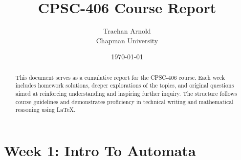 \documentclass[11pt]{article}
\title{CPSC-406 Course Report}
\author{Traehan Arnold \\ Chapman University}
\date{\today}
\begin{document}
\maketitle

\begin{abstract}
This document serves as a cumulative report for the CPSC-406 course. Each week includes homework solutions, deeper explorations of the topics, and original questions aimed at reinforcing understanding and inspiring further inquiry. The structure follows course guidelines and demonstrates proficiency in technical writing and mathematical reasoning using \LaTeX.
\end{abstract}

\tableofcontents
\newpage

\section{Week 1: Intro To Automata}
\end{document}
